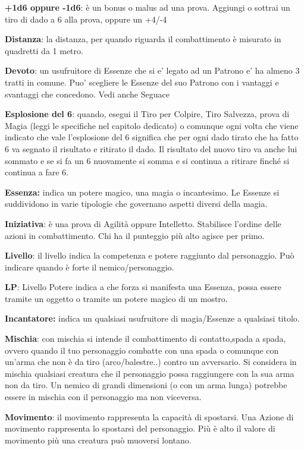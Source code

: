 \documentclass[a4paper,11pt,twoside,openany]{book}
\begin{document}
\textbf{+1d6 oppure -1d6}: è un bonus o malus ad una prova. Aggiungi o sottrai un tiro di dado a 6 alla prova, oppure un +4/-4

\textbf{Distanza}: la distanza, per quando riguarda il combattimento è misurato in quadretti da 1 metro.

\textbf{Devoto}: un usufruitore di Essenze che si e’ legato ad un Patrono e’ ha almeno 3 tratti in comune.
Puo’ scegliere le Essenze del suo Patrono con i vantaggi e svantaggi che concedono. Vedi anche Seguace

\textbf{Esplosione del 6}: quando, esegui il Tiro per Colpire, Tiro Salvezza, prova di Magia (leggi le specifiche nel capitolo dedicato) o comunque ogni volta che viene indicato che vale l'esplosione del 6 significa che per ogni dado tirato che ha fatto 6 va segnato il risultato e ritirato il dado. Il risultato del nuovo tiro va anche lui sommato e se si fa un 6 nuovamente si somma e si continua a ritirare finché si continua a fare 6.

\textbf{Essenza:} indica un potere magico, una magia o incantesimo. Le Essenze si suddividono in varie tipologie che governano aspetti diversi della magia.

\textbf{Iniziativa}: è una prova di Agilità oppure Intelletto. Stabilisce l'ordine delle azioni in combattimento. Chi ha il punteggio più alto agisce per primo.

\textbf{Livello}: il livello indica la competenza e potere raggiunto dal personaggio. Può indicare quando è forte il nemico/personaggio.

\textbf{LP}: Livello Potere indica a che forza si manifesta una Essenza, possa essere tramite un oggetto o tramite un potere magico di un mostro.

\textbf{Incantatore:} indica un qualsiasi usufruitore di magia/Essenze a qualsiasi titolo.

\textbf{Mischia}: con mischia si intende il combattimento di contatto,spada a spada, ovvero quando il tuo personaggio combatte con una spada o comunque con un'arma che non è da tiro (arco/balestre..) contro un avversario.
Si considera in mischia qualsiasi creatura che il personaggio possa raggiungere con la sua arma non da tiro. Un nemico di grandi dimensioni (o con un arma lunga) potrebbe essere in mischia con il personaggio ma non viceversa.

\textbf{Movimento}: il movimento rappresenta la capacità di spostarsi. Una Azione di movimento rappresenta lo spostarsi del personaggio. Più è alto il valore di movimento più una creatura può muoversi lontano.
\end{document}
